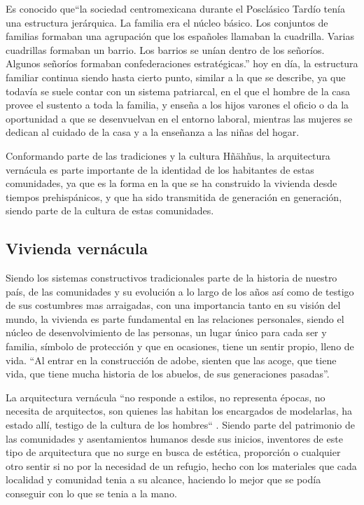 Es conocido que``la sociedad centromexicana durante el Posclásico Tardío tenía una estructura jerárquica. La familia era el núcleo básico. Los conjuntos de familias formaban una agrupación que los españoles llamaban la cuadrilla. Varias cuadrillas formaban un barrio. Los barrios se unían dentro de los señoríos. Algunos señoríos formaban confederaciones estratégicas.'' \citep[p. 156]{Otomies} hoy en día, la estructura familiar continua siendo hasta cierto punto, similar a la que se describe, ya que todavía se suele contar con un sistema patriarcal, en el que el hombre de la casa provee el sustento a toda la familia, y enseña a los hijos varones el oficio o da la oportunidad a que se desenvuelvan en el entorno laboral, mientras las mujeres se dedican al cuidado de la casa y a la enseñanza a las niñas del hogar.

Conformando parte de las tradiciones y la cultura Hñähñus, la arquitectura vernácula es parte importante de la identidad de los habitantes de estas comunidades, ya que es la forma en la que se ha construido la vivienda desde tiempos prehispánicos, y que ha sido transmitida de generación en generación, siendo parte de la cultura de estas comunidades.

\subsection{Vivienda vernácula}
Siendo los sistemas constructivos tradicionales parte de la historia de nuestro país, de las comunidades y su evolución a lo largo de los años así como de testigo de sus costumbres mas arraigadas, con una importancia tanto en su visión del mundo, la vivienda es parte fundamental en las relaciones personales, siendo el núcleo de desenvolvimiento de las personas, un lugar único para cada ser y familia, símbolo de protección y que en ocasiones, tiene un sentir propio, lleno de vida. ``Al entrar en la construcción de adobe, sienten que las acoge, que tiene vida, que tiene mucha historia de los abuelos, de sus generaciones pasadas''\citep{jeronimas}.

La arquitectura vernácula ``no responde a estilos, no representa épocas, no necesita de arquitectos, son quienes las habitan los encargados de modelarlas, ha estado allí, testigo de la cultura de los hombres`` \citep{gonzalez2017arquitectura}. Siendo parte del patrimonio de las comunidades y asentamientos humanos desde sus inicios, inventores de este tipo de arquitectura que no surge en busca de estética, proporción o cualquier otro sentir si no por la necesidad de un refugio, hecho con los materiales que cada localidad y comunidad tenia a su alcance, haciendo lo mejor que se podía conseguir con lo que se tenia a la mano.

